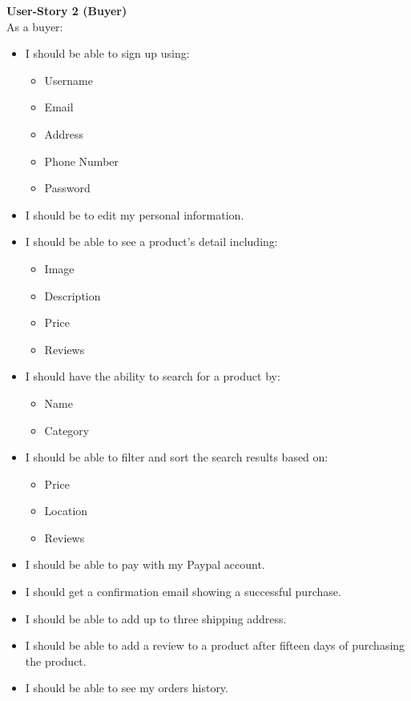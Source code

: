 \documentclass[11pt]{article}
\begin{document}
\textbf{User-Story 2 (Buyer)} \\
As a buyer:
\begin{itemize}
    \item I should be able to sign up using:
        \begin{itemize}
            \item Username
            \item Email
            \item Address
            \item Phone Number
            \item Password
        \end{itemize}
    \item I should be to edit my personal information.
    \item I should be able to see a product's detail including:
        \begin{itemize}
            \item Image
            \item Description
            \item Price
            \item Reviews
        \end{itemize}
    \item I should have the ability to search for a product by:
        \begin{itemize}
            \item Name
            \item Category
        \end{itemize}
    \item I should be able to filter and sort the search results based on:
        \begin{itemize}
            \item Price
            \item Location
            \item Reviews
        \end{itemize}
    \item I should be able to pay with my Paypal account.
    \item I should get a confirmation email showing a successful purchase.
    \item I should be able to add up to three shipping address.
    \item I should be able to add a review to a product after fifteen days of purchasing the product.
    \item I should be able to see my orders history.
    
\end{itemize}
\end{document}
